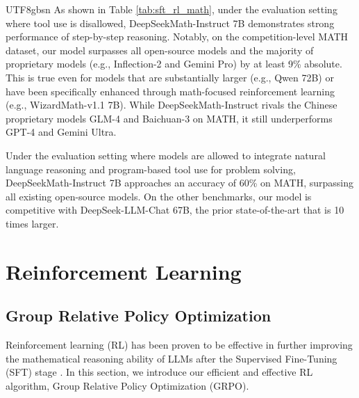 \documentclass[11pt, a4paper, logo, copyright, nonumbering]{deepseek}
\newcommand{\spmath}{DeepSeekMath}
\begin{document}
\begin{CJK*}{UTF8}{gbsn}
As shown in Table \ref{tab:sft_rl_math}, under the evaluation setting where tool use is disallowed, \spmath-Instruct 7B demonstrates strong performance of step-by-step reasoning.
Notably, on the competition-level MATH dataset, our model surpasses all open-source models and the majority of proprietary models (e.g., Inflection-2 and Gemini Pro) by at least 9\% absolute.
This is true even for models that are substantially larger (e.g., Qwen 72B) or have been specifically enhanced through math-focused reinforcement learning (e.g., WizardMath-v1.1 7B).
While \spmath-Instruct rivals the Chinese proprietary models GLM-4 and Baichuan-3 on MATH, it still underperforms GPT-4 and Gemini Ultra.

Under the evaluation setting where models are allowed to integrate natural language reasoning and program-based tool use for problem solving, \spmath-Instruct 7B approaches an accuracy of 60\% on MATH, surpassing all existing open-source models.
On the other benchmarks, our model is competitive with DeepSeek-LLM-Chat 67B, the prior state-of-the-art that is 10 times larger.
\section{Reinforcement Learning}

\subsection{Group Relative Policy Optimization}
Reinforcement learning (RL) has been proven to be effective in further improving the mathematical reasoning ability of LLMs after the Supervised Fine-Tuning (SFT) stage \citep{wang2023math,wizardmath}.
In this section, we introduce our efficient and effective RL algorithm, Group Relative Policy Optimization (GRPO).


\end{CJK*}
\end{document}
